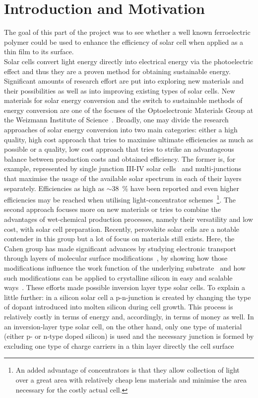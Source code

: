 \section{Introduction and Motivation}
The goal of this part of the project was to see whether a well known ferroelectric polymer could be used to enhance the efficiency of solar cell when applied as a thin film to its surface.\\
Solar cells convert light energy directly into electrical energy via the photoelectric effect and thus they are a proven method for obtaining sustainable energy. Significant amounts of research effort are put into exploring new materials and their possibilities as well as into improving existing types of solar cells. New materials for solar energy conversion and the switch to sustainable methods of energy conversion are one of the focuses of the Optoelectronic Materials Group at the Weizmann Institute of Science~\cite{cahen_energylimitations,cahen_opvlimitations,cahen_energycrisis}. Broadly, one may divide the research approaches of solar energy conversion into two main categories: either a high quality, high cost approach that tries to maximise ultimate efficiencies as much as possible or a  quality, low cost approach that tries to strike an advantageous balance between production costs and obtained efficiency. The former is, for example, represented by  single junction III-IV solar cells~\cite{schermer_35} and  multi-junctions that maximise the usage of the available solar spectrum in each of their layers separately. Efficiencies as high as $\sim$\SI{38}{\percent} have been reported \cite{efftab} and even higher efficiencies may be reached when utilising light-concentrator schemes~\footnote{An added advantage of concentrators is that they allow collection of light over a great area with relatively cheap lens materials and minimise the area necessary for the costly actual cell.}. The second approach focuses more on new materials or tries to combine the advantages of wet-chemical production processes, namely their versatility and low cost, with solar cell preparation. Recently, perovskite solar cells are a notable contender in this group\cite{saar} but a lot of focus on  materials still exists. Here, the Cahen group has made significant advances by studying electronic transport through layers of molecular surface modifications~\cite{cahen_alkyltransport}, by showing how those modifications influence the work function of the underlying substrate~\cite{tal_wfcontrol} and how such modifications can be applied to crystalline silicon in easy and scalable ways~\cite{cahen_alkyl}. These efforts made possible inversion layer type solar cells. To explain a little further: in a  silicon solar cell a p-n-junction is created by changing the type of dopant introduced into molten silicon during cell growth. This process is relatively costly in terms of energy and, accordingly, in terms of money as well. In an inversion-layer type solar cell, on the other hand, only one type of material (either p- or n-type doped silicon) is used and the necessary junction is formed by excluding one type of charge carriers in a thin layer directly the cell surface 